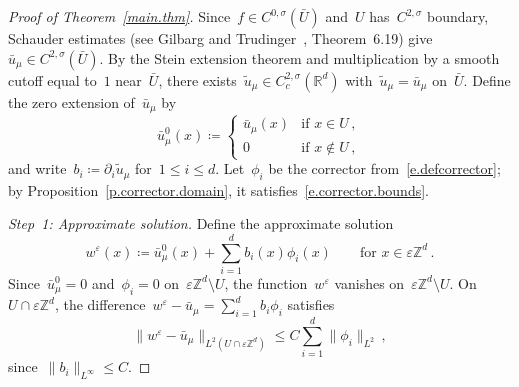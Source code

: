 \documentclass[11pt]{amsart}
\theoremstyle{plain}
\theoremstyle{definition}
\theoremstyle{remark}
\newcommand{\Zd}{\mathbb{Z}^d}
\newcommand{\Rd}{\mathbb{R}^d}
\newcommand{\eps}{\varepsilon}
\begin{document}
	\begin{proof}[Proof of Theorem~\ref{main.thm}]
		Since~$f \in C^{0,\sigma}(\bar U)$ and~$U$ has~$C^{2,\sigma}$ boundary, Schauder estimates (see Gilbarg and Trudinger~\cite{GilbargTrudinger2001}, Theorem~6.19) give~$\bar u_\mu \in C^{2,\sigma}(\bar U)$.
		By the Stein extension theorem and multiplication by a smooth cutoff equal to~$1$ near~$\bar U$, there exists~$\widetilde u_\mu \in C^{2,\sigma}_c(\Rd)$ with~$\widetilde u_\mu = \bar u_\mu$ on~$\bar U$.
		Define the zero extension of~$\bar u_\mu$ by
		\begin{equation}
			\label{e.ubar0}
			\bar u_\mu^0(x) \coloneqq
			\begin{cases}
				\bar u_\mu(x) & \text{if } x \in U\,,\\
				0 & \text{if } x \notin U\,,
			\end{cases}
		\end{equation}
		and write~$b_i \coloneqq \partial_i \widetilde u_\mu$ for~$1 \le i \le d$.
		Let~$\phi_i$ be the corrector from~\eqref{e.defcorrector}; by Proposition~\ref{p.corrector.domain}, it satisfies~\eqref{e.corrector.bounds}.
		
		\emph{Step~1: Approximate solution.}
		Define the approximate solution
		\begin{equation}
			\label{e.weps}
			w^\eps(x) \coloneqq \bar u_\mu^0(x) + \sum_{i=1}^d b_i(x) \phi_i(x) \qquad \text{for } x \in \eps\Zd\,.
		\end{equation}
		Since~$\bar u_\mu^0 = 0$ and~$\phi_i = 0$ on~$\eps\Zd \setminus U$, the function~$w^\eps$ vanishes on~$\eps\Zd \setminus U$.
		On~$U \cap \eps\Zd$, the difference~$w^\eps - \bar u_\mu = \sum_{i=1}^{d} b_i \phi_i$ satisfies
		\begin{equation}
			\label{e.weps.approx}
			\|w^\eps - \bar u_\mu\|_{L^2(U \cap \eps\Zd)} \le C\sum_{i=1}^d \|\phi_i\|_{L^2}\,,
		\end{equation}
		since~$\|b_i\|_{L^\infty} \le C$.
		

\end{proof}
\end{document}
